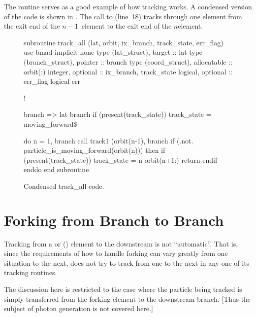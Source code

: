 {{{{{{{{The  routine serves as a good example of how tracking
works. A condensed version of the code is shown in
. The call to  (line~18) tracks
through one element from the exit end of the $n-1$\St\ element to the
exit end of the $n$\Th element.

\begin{figure}[h!]
\begin{centering}
\small
\begin{listing}{1}
  subroutine track_all (lat, orbit, ix_branch, track_state, err_flag)
    use bmad
    implicit none
    type (lat_struct), target :: lat
    type (branch_struct), pointer :: branch
    type (coord_struct), allocatable :: orbit(:)
    integer, optional :: ix_branch, track_state
    logical, optional :: err_flag
    logical err

    ! 

    branch => lat%
    branch%
    if (present(track_state)) track_state = moving_forward\$

    do n = 1, branch%
      call track1 (orbit(n-1), branch%
      if (.not. particle_is_moving_forward(orbit(n))) then
        if (present(track_state)) track_state = n
        orbit(n+1:)%
        return
      endif
    enddo
  end subroutine
\end{listing}
\caption{Condensed track_all code.}
\label{f:track.all}
\end{centering}
\end{figure}

\section{Forking from Branch to Branch}

Tracking from a  or  () element
to the downstream  is not ``automatic''. That is, since the
requirements of how to handle forking can vary greatly from one
situation to the next, \bmad does not try to track from one 
to the next in any one of its tracking routines. 

The discussion here is restricted to the case where the particle being
tracked is simply transferred from the forking element to the downstream
branch. [Thus the subject of photon generation is not covered here.]

}}}}}}}}
